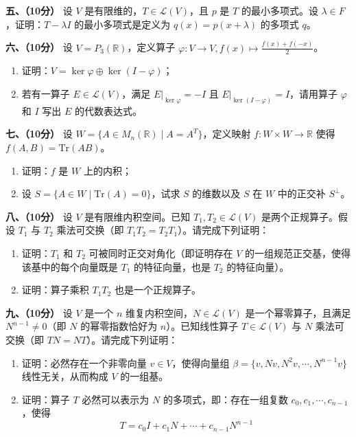 \documentclass[a4paper,12pt]{ctexart}
\begin{document}
\vspace{1.5em}
\noindent\textbf{五、（10分）} 设 $V$ 是有限维的，$T \in \mathcal{L}(V)$，且 $p$ 是 $T$ 的最小多项式。设 $\lambda \in F$，证明：$T - \lambda I$ 的最小多项式是定义为 $q(x) = p(x + \lambda)$ 的多项式 $q$。

\vspace{1.5em}
\noindent\textbf{六、（10分）} 设 $V = P_3(\mathbb{R})$，定义算子 $\varphi: V \to V, f(x) \mapsto \frac{f(x)+f(-x)}{2}$。
\begin{enumerate}
    \item 证明：$V = \ker \varphi \oplus \ker(I - \varphi)$；
    \item 若有一算子 $E \in \mathcal{L}(V)$，满足 $E|_{\ker \varphi} = -I$ 且 $E|_{\ker(I-\varphi)} = I$，请用算子 $\varphi$ 和 $I$ 写出 $E$ 的代数表达式。
\end{enumerate}

\vspace{1.5em}
\noindent\textbf{七、（10分）} 设 $W = \{A \in M_n(\mathbb{R}) \mid A = A^T\}$，定义映射 $f: W \times W \to \mathbb{R}$ 使得 $f(A, B) = \mathrm{Tr}(AB)$。
\begin{enumerate}
    \item 证明：$f$ 是 $W$ 上的内积；
    \item 设 $S = \{A \in W \mid \mathrm{Tr}(A) = 0\}$，试求 $S$ 的维数以及 $S$ 在 $W$ 中的正交补 $S^\perp$。
\end{enumerate}

\vspace{1.5em}
\noindent\textbf{八、（10分）} 设 $V$ 是有限维内积空间。已知 $T_1, T_2 \in \mathcal{L}(V)$ 是两个正规算子。假设 $T_1$ 与 $T_2$ 乘法可交换（即 $T_1 T_2 = T_2 T_1$）。请完成下列证明：
\begin{enumerate}
    \item 证明：$T_1$ 和 $T_2$ 可被同时正交对角化（即证明存在 $V$ 的一组规范正交基，使得该基中的每个向量既是 $T_1$ 的特征向量，也是 $T_2$ 的特征向量）。
    \item 证明：算子乘积 $T_1 T_2$ 也是一个正规算子。
\end{enumerate}

\vspace{1.5em}
\noindent\textbf{九、（10分）} 设 $V$ 是一个 $n$ 维复内积空间，$N \in \mathcal{L}(V)$ 是一个幂零算子，且满足 $N^{n-1} \neq 0$（即 $N$ 的幂零指数恰好为 $n$）。已知线性算子 $T \in \mathcal{L}(V)$ 与 $N$ 乘法可交换（即 $TN = NT$）。请完成下列证明：
\begin{enumerate}
    \item 证明：必然存在一个非零向量 $v \in V$，使得向量组 $\beta = \{v, Nv, N^2v, \cdots, N^{n-1}v\}$ 线性无关，从而构成 $V$ 的一组基。
    \item 证明：算子 $T$ 必然可以表示为 $N$ 的多项式，即：存在一组复数 $c_0, c_1, \cdots, c_{n-1}$，使得
    \[
    T = c_0 I + c_1 N + \cdots + c_{n-1} N^{n-1}
    \]
\end{enumerate}
\end{document}
